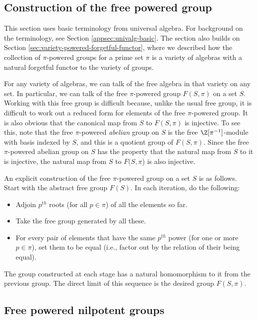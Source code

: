 \documentclass{ucetd}
\begin{document}
\subsection{Construction of the free powered group}

This section uses basic terminology from universal algebra. For
background on the terminology, see Section
\ref{appsec:univalg-basic}. The section also builds on Section
\ref{sec:variety-powered-forgetful-functor}, where we described how the
collection of $\pi$-powered groups for a prime set $\pi$ is a variety
of algebras with a natural forgetful functor to the variety of groups.

For any variety of algebras, we can talk of the free algebra in that
variety on any set. In particular, we can talk of the free
$\pi$-powered group $F(S,\pi)$ on a set $S$. Working with this free
group is difficult because, unlike the usual free group, it is
difficult to work out a reduced form for elements of the free
$\pi$-powered group. It is also obvious that the canonical map from
$S$ to $F(S,\pi)$ is injective. To see this, note that the free
$\pi$-powered {\em abelian} group on $S$ is the free
$\Z[\pi^{-1}]$-module with basis indexed by $S$, and this is a
quotient group of $F(S,\pi)$. Since the free $\pi$-powered abelian
group on $S$ has the property that the natural map from $S$ to it is
injective, the natural map from $S$ to $F(S,\pi$) is also injective.

An explicit construction of the free $\pi$-powered group on a set $S$
is as follows. Start with the abstract free group $F(S)$. In each
iteration, do the following:

\begin{itemize}
\item Adjoin $p^{th}$ roots (for all $p \in \pi$) of all the elements so far.
\item Take the free group generated by all these.
\item For every pair of elements that have the same
  $p^{th}$ power (for one or more $p \in \pi$), set them
  to be equal (i.e., factor out by the relation of their being
  equal).
\end{itemize}

The group constructed at each stage has a natural homomorphism to it
from the previous group. The direct limit of this sequence is the
desired group $F(S,\pi)$.

\subsection{Free powered nilpotent groups}\label{sec:free-powered-nilpotent}
\end{document}

